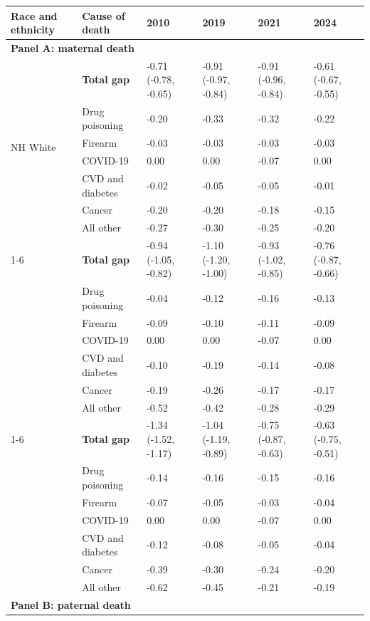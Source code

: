 \begin{threeparttable}
\begin{tabular}{llllll}
\toprule
Race and ethnicity & Cause of death & 2010 & 2019 & 2021 & 2024 \\
\midrule
\multicolumn{6}{l}{\textbf{Panel A: maternal death}} \\
\multirow{7}{*}{NH White} & \textbf{Total gap} & -0.71 (-0.78, -0.65) & -0.91 (-0.97, -0.84) & -0.91 (-0.96, -0.84) & -0.61 (-0.67, -0.55) \\
 & Drug poisoning & -0.20 & -0.33 & -0.32 & -0.22 \\
 & Firearm & -0.03 & -0.03 & -0.03 & -0.03 \\
 & COVID-19 & 0.00 & 0.00 & -0.07 & 0.00 \\
 & CVD and diabetes & -0.02 & -0.05 & -0.05 & -0.01 \\
 & Cancer & -0.20 & -0.20 & -0.18 & -0.15 \\
 & All other & -0.27 & -0.30 & -0.25 & -0.20 \\
\cmidrule(lr){1-6}
\multirow{7}{*}{NH Black} & \textbf{Total gap} & -0.94 (-1.05, -0.82) & -1.10 (-1.20, -1.00) & -0.93 (-1.02, -0.85) & -0.76 (-0.87, -0.66) \\
 & Drug poisoning & -0.04 & -0.12 & -0.16 & -0.13 \\
 & Firearm & -0.09 & -0.10 & -0.11 & -0.09 \\
 & COVID-19 & 0.00 & 0.00 & -0.07 & 0.00 \\
 & CVD and diabetes & -0.10 & -0.19 & -0.14 & -0.08 \\
 & Cancer & -0.19 & -0.26 & -0.17 & -0.17 \\
 & All other & -0.52 & -0.42 & -0.28 & -0.29 \\
\cmidrule(lr){1-6}
\multirow{7}{*}{Hispanic} & \textbf{Total gap} & -1.34 (-1.52, -1.17) & -1.04 (-1.19, -0.89) & -0.75 (-0.87, -0.63) & -0.63 (-0.75, -0.51) \\
 & Drug poisoning & -0.14 & -0.16 & -0.15 & -0.16 \\
 & Firearm & -0.07 & -0.05 & -0.03 & -0.04 \\
 & COVID-19 & 0.00 & 0.00 & -0.07 & 0.00 \\
 & CVD and diabetes & -0.12 & -0.08 & -0.05 & -0.04 \\
 & Cancer & -0.39 & -0.30 & -0.24 & -0.20 \\
 & All other & -0.62 & -0.45 & -0.21 & -0.19 \\
\midrule
\multicolumn{6}{l}{\textbf{Panel B: paternal death}} \\

\end{tabular}
\end{threeparttable}
